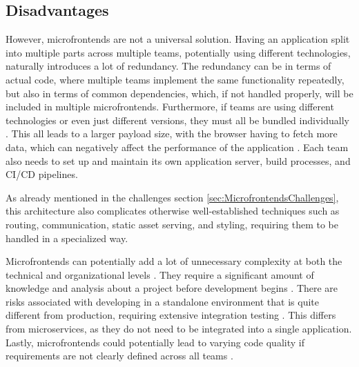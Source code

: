 \subsection{Disadvantages}
However, microfrontends are not a universal solution. Having an application split into multiple parts across multiple teams, potentially using different technologies, naturally introduces a lot of redundancy. The redundancy can be in terms of actual code, where multiple teams implement the same functionality repeatedly, but also in terms of common dependencies, which, if not handled properly, will be included in multiple microfrontends. Furthermore, if teams are using different technologies or even just different versions, they must all be bundled individually \cite{Geers, Peltonen}. This all leads to a larger payload size, with the browser having to fetch more data, which can negatively affect the performance of the application \cite{Peltonen, Montelius, Jackson}. Each team also needs to set up and maintain its own application server, build processes, and CI/CD pipelines.

As already mentioned in the challenges section \ref{sec:MicrofrontendsChallenges}, this architecture also complicates otherwise well-established techniques such as routing, communication, static asset serving, and styling, requiring them to be handled in a specialized way.

Microfrontends can potentially add a lot of unnecessary complexity at both the technical and organizational levels \cite{Peltonen}. They require a significant amount of knowledge and analysis about a project before development begins \cite{Montelius, Peltonen}. There are risks associated with developing in a standalone environment that is quite different from production, requiring extensive integration testing \cite{Jackson, Montelius, Peltonen}. This differs from microservices, as they do not need to be integrated into a single application. Lastly, microfrontends could potentially lead to varying code quality if requirements are not clearly defined across all teams \cite{Montelius}.